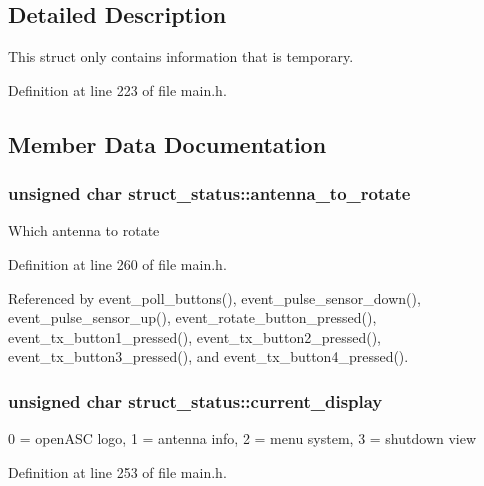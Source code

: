 \subsection{Detailed Description}
This struct only contains information that is temporary. 

Definition at line 223 of file main.h.

\subsection{Member Data Documentation}
\hypertarget{structstruct__status_058a4d1fe0aa8518467dafffe213d091}{
\subsubsection[{antenna\_\-to\_\-rotate}]{\setlength{\rightskip}{0pt plus 5cm}unsigned char {\bf struct\_\-status::antenna\_\-to\_\-rotate}}}
\label{structstruct__status_058a4d1fe0aa8518467dafffe213d091}


Which antenna to rotate 

Definition at line 260 of file main.h.

Referenced by event\_\-poll\_\-buttons(), event\_\-pulse\_\-sensor\_\-down(), event\_\-pulse\_\-sensor\_\-up(), event\_\-rotate\_\-button\_\-pressed(), event\_\-tx\_\-button1\_\-pressed(), event\_\-tx\_\-button2\_\-pressed(), event\_\-tx\_\-button3\_\-pressed(), and event\_\-tx\_\-button4\_\-pressed().\hypertarget{structstruct__status_5a07897b99cf7c72c0c543b5157043c8}{
\subsubsection[{current\_\-display}]{\setlength{\rightskip}{0pt plus 5cm}unsigned char {\bf struct\_\-status::current\_\-display}}}
\label{structstruct__status_5a07897b99cf7c72c0c543b5157043c8}


0 = openASC logo, 1 = antenna info, 2 = menu system, 3 = shutdown view 

Definition at line 253 of file main.h.

